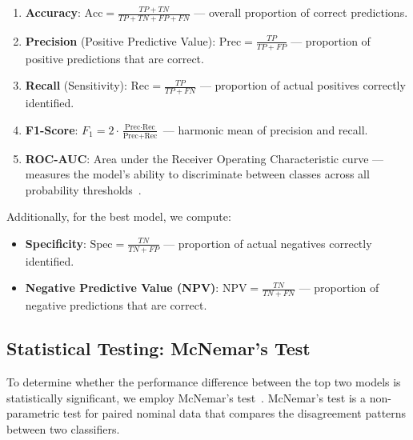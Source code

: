 \documentclass[conference,10pt]{IEEEtran}
\begin{document}
\begin{enumerate}
    \item \textbf{Accuracy}: $\text{Acc} = \frac{TP + TN}{TP + TN + FP + FN}$ — overall proportion of correct predictions.
    \item \textbf{Precision} (Positive Predictive Value): $\text{Prec} = \frac{TP}{TP + FP}$ — proportion of positive predictions that are correct.
    \item \textbf{Recall} (Sensitivity): $\text{Rec} = \frac{TP}{TP + FN}$ — proportion of actual positives correctly identified.
    \item \textbf{F1-Score}: $F_1 = 2 \cdot \frac{\text{Prec} \cdot \text{Rec}}{\text{Prec} + \text{Rec}}$ — harmonic mean of precision and recall.
    \item \textbf{ROC-AUC}: Area under the Receiver Operating Characteristic curve — measures the model's ability to discriminate between classes across all probability thresholds~\cite{fawcett2006introduction}.
\end{enumerate}

Additionally, for the best model, we compute:
\begin{itemize}
    \item \textbf{Specificity}: $\text{Spec} = \frac{TN}{TN + FP}$ — proportion of actual negatives correctly identified.
    \item \textbf{Negative Predictive Value (NPV)}: $\text{NPV} = \frac{TN}{TN + FN}$ — proportion of negative predictions that are correct.
\end{itemize}

\subsection{Statistical Testing: McNemar's Test}
\label{subsec:mcnemar}

To determine whether the performance difference between the top two models is statistically significant, we employ McNemar's test~\cite{mcnemar1947note}. McNemar's test is a non-parametric test for paired nominal data that compares the disagreement patterns between two classifiers.
\end{document}
